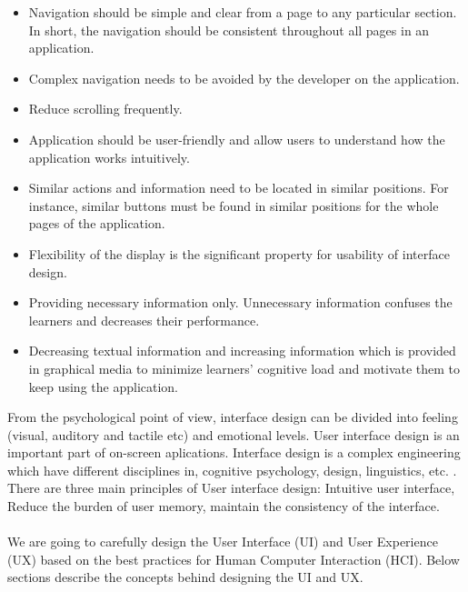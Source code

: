 \documentclass[12pt]{article}
\begin{document}
\begin{itemize}

 \item  Navigation should be simple and clear from a page to
any particular section. In short, the navigation should be
consistent throughout all pages in an application.

 \item  Complex navigation needs to be avoided by the
developer on the application.

 \item Reduce scrolling frequently.

 \item Application should be user-friendly and allow
users to understand how the application works intuitively.

 \item Similar actions and information need to be located in
similar positions. For instance, similar buttons must be
found in similar positions for the whole pages of the
application.

 \item Flexibility of the display is the significant property for
usability of interface design.

 \item Providing necessary information only. Unnecessary
information confuses the learners and decreases their
performance.

 \item  Decreasing textual information and increasing
information which is provided in graphical media to minimize learners' cognitive load and motivate
them to keep using the application.

\end{itemize}


From the psychological point of view, interface design can be divided into feeling (visual, auditory and tactile etc) and emotional levels. User interface design is an important part of on-screen aplications. Interface design is a complex engineering which have different disciplines in, cognitive psychology, design, linguistics, etc. \cite{hci}. There are three main principles of User interface design:  Intuitive user interface, Reduce the burden of user memory, maintain the consistency of the interface. 


\paragraph{}We are going to carefully design the User Interface (UI) and User Experience (UX) based on the best practices for Human Computer Interaction (HCI). Below sections describe the concepts behind designing the UI and UX.
\end{document}
